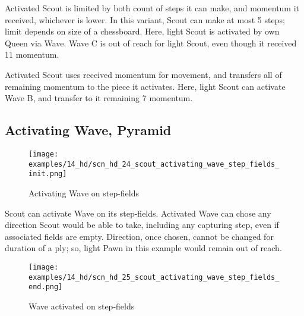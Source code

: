\vspace*{-0.5\baselineskip}
Activated Scout is limited by both count of steps it can make, and momentum it
received, whichever is lower. In this variant, Scout can make at most 5 steps;
limit depends on size of a chessboard. Here, light Scout is activated by own
Queen via Wave. Wave C is out of reach for light Scout, even though it received
11 momentum.

Activated Scout uses received momentum for movement, and transfers all of
remaining momentum to the piece it activates. Here, light Scout can activate
Wave B, and transfer to it remaining 7 momentum.

\clearpage %

\subsection*{Activating Wave, Pyramid}
\label{sec:Hemera's Dawn/Scout/Activating Wave, Pyramid}

\vspace*{-1.5\baselineskip}
\noindent
\begin{figure}[!h]
\texttt{[image: examples/14\_hd/scn\_hd\_24\_scout\_activating\_wave\_step\_fields\_init.png]}
\vspace*{-1.4\baselineskip}
\caption{Activating Wave on step-fields}
\label{fig:scn_hd_24_scout_activating_wave_step_fields_init}
\end{figure}

\vspace*{-0.5\baselineskip}
Scout can activate Wave on its step-fields. Activated Wave can chose any direction
Scout would be able to take, including any capturing step, even if associated fields
are empty.\newline
\indent
Direction, once chosen, cannot be changed for duration of a ply; so, light Pawn
in this example would remain out of reach.

\clearpage %

\vspace*{-2.3\baselineskip}
\noindent
\begin{figure}[!h]
\texttt{[image: examples/14\_hd/scn\_hd\_25\_scout\_activating\_wave\_step\_fields\_end.png]}
\vspace*{-1.4\baselineskip}
\caption{Wave activated on step-fields}
\label{fig:scn_hd_25_scout_activating_wave_step_fields_end}
\end{figure}


